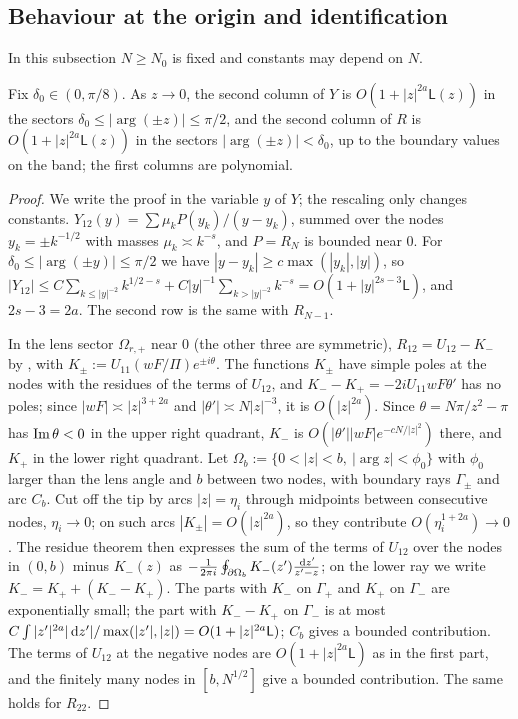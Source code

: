 \subsection{Behaviour at the origin and identification}\label{app:pone-ident}

In this subsection $N\ge N_0$ is fixed and constants may depend on $N$.

\begin{lemma}[Behaviour of $Y$ at $0$]\label{lem:pone-y4}
Fix $\delta_0\in(0,\pi/8)$. As $z\to0$, the second column of $Y$ is $O(1+|z|^{2a}\mathsf L(z))$ in the sectors
$\delta_0\le|\arg(\pm z)|\le\pi/2$, and the second column of $R$ is $O(1+|z|^{2a}\mathsf L(z))$ in the sectors
$|\arg(\pm z)|<\delta_0$, up to the boundary values on the band; the first columns are polynomial.
\end{lemma}

\begin{proof}
We write the proof in the variable $y$ of $Y$; the rescaling only changes constants. $Y_{12}(y)=\sum\mu_kP(y_k)/(y-y_k)$, summed
over the nodes $y_k=\pm k^{-1/2}$ with masses $\mu_k\asymp k^{-s}$, and $P=R_N$ is bounded near $0$. For
$\delta_0\le|\arg(\pm y)|\le\pi/2$ we have $|y-y_k|\ge c\max(|y_k|,|y|)$, so
$|Y_{12}|\le C\sum_{k\le|y|^{-2}}k^{1/2-s}+C|y|^{-1}\sum_{k>|y|^{-2}}k^{-s}=O(1+|y|^{2s-3}\mathsf L)$, and $2s-3=2a$. The second row
is the same with $R_{N-1}$.

In the lens sector $\Omega_{r,+}$ near $0$ (the other three are symmetric), $R_{12}=U_{12}-K_-$ by \cite[(3.11)--(3.12)]{WLXZ},
with $K_\pm:=U_{11}(wF/\Pi)e^{\pm i\theta}$. The functions $K_\pm$ have simple poles at the nodes with the residues of the
terms of $U_{12}$, and $K_--K_+=-2iU_{11}wF\theta'$ has no poles; since $|wF|\asymp|z|^{3+2a}$ and $|\theta'|\asymp N|z|^{-3}$,
it is $O(|z|^{2a})$. Since $\theta=N\pi/z^2-\pi$ has $\operatorname{Im}\theta<0$ in the upper right quadrant, $K_-$ is
$O(|\theta'||wF|e^{-cN/|z|^2})$ there, and $K_+$ in the lower right quadrant. Let $\Omega_b:=\{0<|z|<b,\ |\arg z|<\phi_0\}$ with
$\phi_0$ larger than the lens angle and $b$ between two nodes, with boundary rays $\Gamma_\pm$ and arc $C_b$. Cut off
the tip by arcs $|z|=\eta_i$ through midpoints between consecutive nodes, $\eta_i\to0$; on such arcs $|K_\pm|=O(|z|^{2a})$, so
they contribute $O(\eta_i^{1+2a})\to0$. The residue theorem then expresses the sum of the terms of $U_{12}$ over the nodes in
$(0,b)$ minus $K_-(z)$ as $-\frac1{2\pi i}\oint_{\partial\Omega_b}K_-(z')\frac{\,\mathrm{d} z'}{z'-z}$; on the lower ray we write
$K_-=K_++(K_--K_+)$. The parts with $K_-$ on $\Gamma_+$ and $K_+$ on $\Gamma_-$ are exponentially small; the part with
$K_--K_+$ on $\Gamma_-$ is at most $C\int|z'|^{2a}|\,\mathrm{d} z'|/\max(|z'|,|z|)=O(1+|z|^{2a}\mathsf L)$; $C_b$ gives a bounded
contribution. The terms of $U_{12}$ at the negative nodes are $O(1+|z|^{2a}\mathsf L)$ as in the first part, and the finitely
many nodes in $[b,N^{1/2}]$ give a bounded contribution. The same holds for $R_{22}$.
\end{proof}

